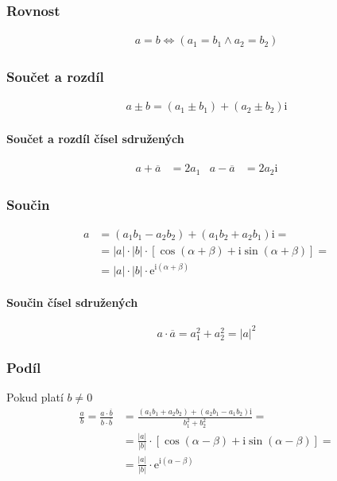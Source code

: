 \documentclass[12pt]{article}
\providecommand{\abs}[1]{\lvert#1\rvert}
\newcommand{\euler}{\mathrm{e}} %
\newcommand{\iu}{\mathrm{i}} %
\begin{document}
\subsubsection{Rovnost}
\begin{align}
a=b \iff \left( a_1 = b_1 \land a_2 = b_2 \right)
\end{align}
\subsubsection{Součet a rozdíl}
\begin{align}
a \pm b = (a_1 \pm b_1) + (a_2 \pm b_2)\iu
\end{align}
\paragraph{Součet a rozdíl čísel sdružených}
\begin{align}
a + \overline{a} &= 2 a_1 & a - \overline{a} &= 2 a_2 \iu
\end{align}
\subsubsection{Součin}
\begin{align}
a &= (a_1 b_1 - a_2 b_2) + (a_1 b_2 + a_2 b_1) \iu =\\
 &= \abs{a} \cdot \abs{b} \cdot \left[ \cos \left( \alpha + \beta \right) + \iu \sin \left(\alpha + \beta \right) \right] =\\
 &= \abs{a} \cdot \abs{b} \cdot \euler^{\iu ( \alpha + \beta )}
\end{align}
\paragraph{Součin čísel sdružených}
\begin{equation}
a \cdot \overline{a} = a_1^2 + a_2^2 = \abs{a}^2
\end{equation}
\subsubsection{Podíl}
Pokud platí $b \neq 0$
\begin{align}
\frac{a}{b} = \frac{a \cdot \overline{b}}{b \cdot \overline{b}} &= \frac{\left( a_1 b_1 + a_2 b_2 \right) + \left( a_2 b_1 - a_1 b_2 \right) \iu}{b_1^2 + b_2^2} = \\
&= \frac{\abs{a}}{\abs{b}} \cdot \left[ \cos (\alpha - \beta ) + \iu \sin (\alpha - \beta ) \right] =\\
 &= \frac{\abs{a}}{\abs{b}} \cdot \euler^{\iu ( \alpha - \beta )}
\end{align}
\end{document}
